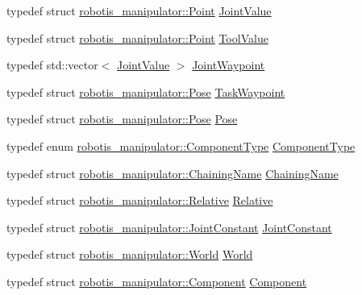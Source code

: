 \begin{DoxyCompactItemize}
\item 
typedef struct \hyperlink{structrobotis__manipulator_1_1_point}{robotis\+\_\+manipulator\+::\+Point} \hyperlink{namespacerobotis__manipulator_aa0556c98c5294ccf3a96c2d0fe315e40}{Joint\+Value}
\item 
typedef struct \hyperlink{structrobotis__manipulator_1_1_point}{robotis\+\_\+manipulator\+::\+Point} \hyperlink{namespacerobotis__manipulator_a54e0b849e686b7c6271dbe01d6ba6ef6}{Tool\+Value}
\item 
typedef std\+::vector$<$ \hyperlink{namespacerobotis__manipulator_aa0556c98c5294ccf3a96c2d0fe315e40}{Joint\+Value} $>$ \hyperlink{namespacerobotis__manipulator_a4456fd8b14e1f6b7733a77837dfe9339}{Joint\+Waypoint}
\item 
typedef struct \hyperlink{structrobotis__manipulator_1_1_pose}{robotis\+\_\+manipulator\+::\+Pose} \hyperlink{namespacerobotis__manipulator_a440e2d88ec85fdee394e540dc6024c3e}{Task\+Waypoint}
\item 
typedef struct \hyperlink{structrobotis__manipulator_1_1_pose}{robotis\+\_\+manipulator\+::\+Pose} \hyperlink{namespacerobotis__manipulator_a5934a151815a32d76af3af3bfe6e5be8}{Pose}
\item 
typedef enum \hyperlink{namespacerobotis__manipulator_a2bbf89d1c08dc1d9ff4e28beb939e382}{robotis\+\_\+manipulator\+::\+Component\+Type} \hyperlink{namespacerobotis__manipulator_a0074428cb994a4539fa1c1950d19db4c}{Component\+Type}
\item 
typedef struct \hyperlink{structrobotis__manipulator_1_1_chaining_name}{robotis\+\_\+manipulator\+::\+Chaining\+Name} \hyperlink{namespacerobotis__manipulator_a9b57e9a97855a185ca26900482155cdd}{Chaining\+Name}
\item 
typedef struct \hyperlink{structrobotis__manipulator_1_1_relative}{robotis\+\_\+manipulator\+::\+Relative} \hyperlink{namespacerobotis__manipulator_a62c82d0cc8d649345afd30cb34b32dd8}{Relative}
\item 
typedef struct \hyperlink{structrobotis__manipulator_1_1_joint_constant}{robotis\+\_\+manipulator\+::\+Joint\+Constant} \hyperlink{namespacerobotis__manipulator_aeefccd90c348d7afefbe86e8380227f9}{Joint\+Constant}
\item 
typedef struct \hyperlink{structrobotis__manipulator_1_1_world}{robotis\+\_\+manipulator\+::\+World} \hyperlink{namespacerobotis__manipulator_ad572cd4a47272e32196fdc45759963e3}{World}
\item 
typedef struct \hyperlink{structrobotis__manipulator_1_1_component}{robotis\+\_\+manipulator\+::\+Component} \hyperlink{namespacerobotis__manipulator_a66033834ce02ad7b8dec1a7228852657}{Component}
\end{DoxyCompactItemize}
